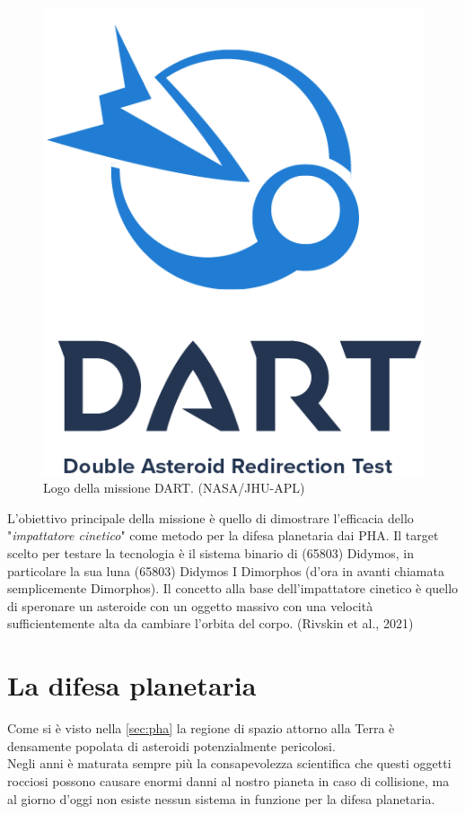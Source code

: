 \documentclass[a4paper,11pt,openright]{book}
\begin{document}
\begin{figure}[!h]
    \centering
    \includegraphics[scale=0.5]{figure/DART_mission_patch.png}
    \caption[Logo della missione DART]{Logo della missione DART. (NASA/JHU-APL)}
    \label{fig:logo_DART}
\end{figure}

L'obiettivo principale della missione è quello di dimostrare l'efficacia dello "\textit{impattatore cinetico}" come metodo per la difesa planetaria dai PHA. Il target scelto per testare la tecnologia è il sistema binario di (65803) Didymos, in particolare la sua luna (65803) Didymos I Dimorphos (d'ora in avanti chiamata semplicemente Dimorphos). Il concetto alla base dell'impattatore cinetico è quello di speronare un asteroide con un oggetto massivo con una velocità sufficientemente alta da cambiare l'orbita del corpo. (Rivskin et al., 2021)

\section{La difesa planetaria}
Come si è visto nella \cref{sec:pha} la regione di spazio attorno alla Terra è densamente popolata di asteroidi potenzialmente pericolosi.\\
Negli anni è maturata sempre più la consapevolezza scientifica che questi oggetti rocciosi possono causare enormi danni al nostro pianeta in caso di collisione, ma al giorno d'oggi non esiste nessun sistema in funzione per la difesa planetaria.
\end{document}
